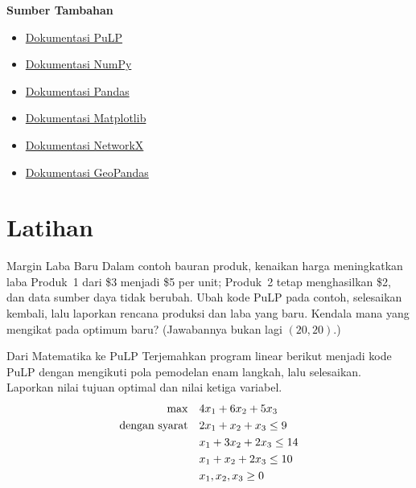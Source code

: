 \begin{resource}
\textbf{Sumber Tambahan}
\begin{itemize}
\item \href{https://coin-or.github.io/pulp/}{Dokumentasi PuLP}
\item \href{https://numpy.org/doc/}{Dokumentasi NumPy}
\item \href{https://pandas.pydata.org/docs/}{Dokumentasi Pandas}
\item \href{https://matplotlib.org/stable/contents.html}{Dokumentasi Matplotlib}
\item \href{https://networkx.org/documentation/}{Dokumentasi NetworkX}
\item \href{https://geopandas.org/}{Dokumentasi GeoPandas}
\end{itemize}
\end{resource}

\section{Latihan}


\begin{ex}{Margin Laba Baru}{}
\label{ex:pulp-new-profit}
Dalam contoh bauran produk, kenaikan harga meningkatkan laba Produk~1 dari \$3 menjadi \$5 per unit; Produk~2 tetap menghasilkan \$2, dan data sumber daya tidak berubah. Ubah kode PuLP pada contoh, selesaikan kembali, lalu laporkan rencana produksi dan laba yang baru. Kendala mana yang mengikat pada optimum baru? (Jawabannya bukan lagi $(20, 20)$.)
\end{ex}

\begin{ex}{Dari Matematika ke PuLP}{}
\label{ex:pulp-translate}
Terjemahkan program linear berikut menjadi kode PuLP dengan mengikuti pola pemodelan enam langkah, lalu selesaikan. Laporkan nilai tujuan optimal dan nilai ketiga variabel.
\begin{align*}
\max \quad & 4x_1 + 6x_2 + 5x_3 \\
\mbox{dengan syarat}\quad        & 2x_1 + x_2 + x_3 \leq 9 \\
& x_1 + 3x_2 + 2x_3 \leq 14 \\
& x_1 + x_2 + 2x_3 \leq 10 \\
& x_1, x_2, x_3 \geq 0
\end{align*}
\end{ex}

